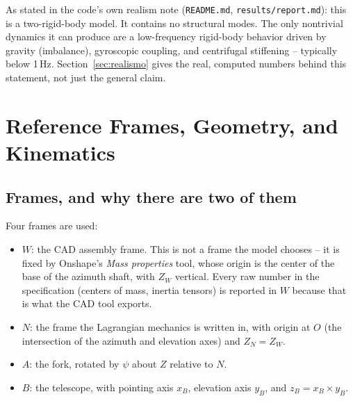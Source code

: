\documentclass[11pt,a4paper]{article}
\numberwithin{equation}{section}
\begin{document}
As stated in the code's own realism note (\texttt{README.md}, \texttt{results/report.md}): this is a two-rigid-body model. It contains no structural modes. The only nontrivial dynamics it can produce are a low-frequency rigid-body behavior driven by gravity (imbalance), gyroscopic coupling, and centrifugal stiffening -- typically below 1\,Hz. Section~\ref{sec:realismo} gives the real, computed numbers behind this statement, not just the general claim.

\section{Reference Frames, Geometry, and Kinematics}
\label{sec:cinematica}

\subsection{Frames, and why there are two of them}
\label{subsec:frames}

Four frames are used:
\begin{itemize}
\item $W$: the CAD assembly frame. This is not a frame the model chooses -- it is fixed by Onshape's \emph{Mass properties} tool, whose origin is the center of the base of the azimuth shaft, with $Z_W$ vertical. Every raw number in the specification (centers of mass, inertia tensors) is reported in $W$ because that is what the CAD tool exports.
\item $N$: the frame the Lagrangian mechanics is written in, with origin at $O$ (the intersection of the azimuth and elevation axes) and $Z_N = Z_W$.
\item $A$: the fork, rotated by $\psi$ about $Z$ relative to $N$.
\item $B$: the telescope, with pointing axis $x_B$, elevation axis $y_B$, and $z_B = x_B \times y_B$.
\end{itemize}
\end{document}

